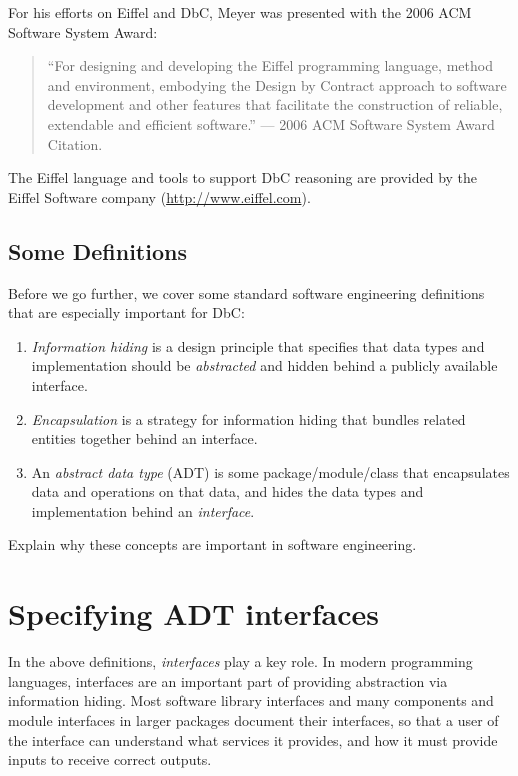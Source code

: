 For his efforts on Eiffel and DbC, Meyer was presented with the 2006 ACM Software System Award:

\begin{quote}
  ``For designing and developing the Eiffel programming language, method and environment, embodying the Design by Contract approach to software development and other features that facilitate the construction of reliable, extendable and efficient software.'' --- 2006 ACM Software System Award Citation.
\end{quote}

The Eiffel language and tools to support DbC reasoning are provided by the Eiffel Software company (\url{http://www.eiffel.com}).

\subsection{Some Definitions}

Before we go further, we cover some standard software engineering definitions that are especially important for DbC:

\begin{enumerate}

  \item \emph{Information hiding} is a design principle that specifies that data types and implementation should be \emph{abstracted} and hidden behind a publicly available interface.

  \item \emph{Encapsulation} is a strategy for information hiding that bundles related entities together behind an interface.

  \item An \emph{abstract data type} (ADT) is some package/module/class that encapsulates data and operations on that data, and hides the data types and implementation behind an \emph{interface}.

\end{enumerate}

\begin{exercise}
Explain why these concepts are important in software engineering.
\end{exercise}

\section{Specifying ADT interfaces}

In the above definitions, \emph{interfaces} play a key role. In modern programming languages, interfaces are an important part of providing abstraction via information hiding. Most software library interfaces and many components and module interfaces in larger packages document their interfaces, so that a user of the interface can understand what services it provides, and how it must provide inputs to receive correct outputs.


